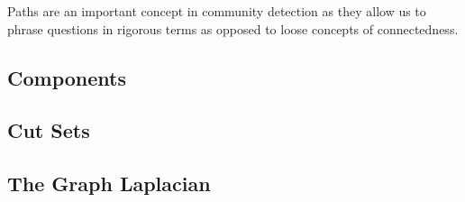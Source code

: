 Paths are an important concept in community detection as they allow us to phrase questions in rigorous terms as opposed to loose concepts of connectedness.

\subsection{Components}

\subsection{Cut Sets}

\subsection{The Graph Laplacian}
